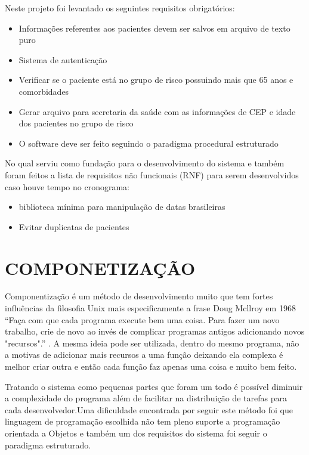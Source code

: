 \documentclass[
	12pt,				%
	oneside,			%
	a4paper,			%
  section=TITLE,
	brazil,				%
	]{abntex2}
\begin{document}
Neste projeto foi levantado os seguintes requisitos obrigatórios:

\begin{itemize}
  \item{Informações referentes aos pacientes devem ser salvos em arquivo de
    texto puro}

  \item{Sistema de autenticação}

  \item{Verificar se o paciente está no grupo de risco possuindo mais que 65 anos
e comorbidades}

  \item{Gerar arquivo para secretaria da saúde com as informações de CEP e
idade dos pacientes no grupo de risco}

  \item{O software deve ser feito seguindo o paradigma procedural estruturado}
\end{itemize}

No qual serviu como fundação para o desenvolvimento do sistema e também foram
feitos a lista de requisitos não funcionais (RNF) para serem desenvolvidos caso houve
tempo no cronograma:

\begin{itemize}
  \item{biblioteca mínima para manipulação de datas brasileiras}
  \item{Evitar duplicatas de pacientes}
\end{itemize}

\section{COMPONETIZAÇÃO}

Componentização é um método de desenvolvimento muito que tem fortes
influências da filosofia Unix mais especificamente a frase Doug Mcllroy em 1968 “Faça com
que cada programa execute bem uma coisa. Para fazer um novo trabalho, crie de novo ao invés
de complicar programas antigos adicionando novos "recursos".”\cite{gancarz1995unix} . A mesma ideia pode ser
utilizada, dentro do mesmo programa, não a motivas de adicionar mais recursos a uma função
deixando ela complexa é melhor criar outra e então cada função faz apenas uma coisa e muito
bem feito.

Tratando o sistema como pequenas partes que foram um todo é possível diminuir a
complexidade do programa além de facilitar na distribuição de tarefas para cada
desenvolvedor.Uma dificuldade encontrada por seguir este método foi que linguagem de
programação escolhida não tem pleno suporte a programação orientada a Objetos e também um
dos requisitos do sistema foi seguir o paradigma estruturado.
\end{document}
